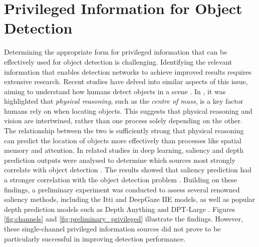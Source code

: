 


\section{Privileged Information for Object Detection}
\label{sec:4_privileged_information}

Determining the appropriate form for privileged information that can be effectively used for object detection is challenging. Identifying the relevant information that enables detection networks to achieve improved results requires extensive research. Recent studies have delved into similar aspects of this issue, aiming to understand how humans detect objects in a scene \cite{object_detection_philospy}. In \cite{object_detection_philospy}, it was highlighted that \textit{physical reasoning}, such as the \textit{centre of mass}, is a key factor humans rely on when locating objects. This suggests that physical reasoning and vision are intertwined, rather than one process solely depending on the other. The relationship between the two is sufficiently strong that physical reasoning can predict the location of objects more effectively than processes like spatial memory and attention.
In related studies in deep learning, saliency \cite{itti, deepgaze} and depth prediction \cite{depth_anything, dpt_large} outputs were analysed to determine which sources most strongly correlate with object detection \cite{bartolo2024correlationobjectdetectionperformance}. The results showed that saliency prediction had a stronger correlation with the object detection problem \cite{bartolo2024correlationobjectdetectionperformance}. Building on these findings, a preliminary experiment was conducted to assess several renowned saliency methods, including the Itti \cite{itti} and DeepGaze IIE \cite{deepgaze} models, as well as popular depth prediction models such as Depth Anything \cite{depth_anything} and DPT-Large \cite{dpt_large}. Figures \ref{fig:channels} and \ref{fig:preliminary_privileged} illustrate the findings. However, these single-channel privileged information sources did not prove to be particularly successful in improving detection performance.

